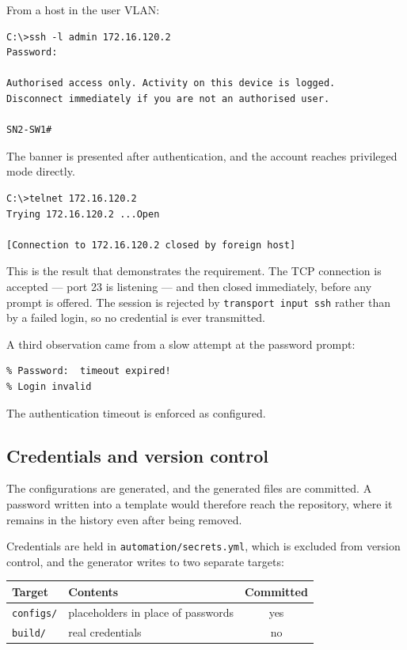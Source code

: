 \documentclass[12pt,a4paper]{article}
\begin{document}
From a host in the user VLAN:

\begin{lstlisting}
C:\>ssh -l admin 172.16.120.2
Password:

Authorised access only. Activity on this device is logged.
Disconnect immediately if you are not an authorised user.

SN2-SW1#
\end{lstlisting}

The banner is presented after authentication, and the account reaches
privileged mode directly.

\begin{lstlisting}
C:\>telnet 172.16.120.2
Trying 172.16.120.2 ...Open

[Connection to 172.16.120.2 closed by foreign host]
\end{lstlisting}

This is the result that demonstrates the requirement. The TCP connection is
accepted --- port 23 is listening --- and then closed immediately, before any
prompt is offered. The session is rejected by \texttt{transport input ssh}
rather than by a failed login, so no credential is ever transmitted.

A third observation came from a slow attempt at the password prompt:

\begin{lstlisting}
% Password:  timeout expired!
% Login invalid
\end{lstlisting}

The authentication timeout is enforced as configured.

\subsection{Credentials and version control}

The configurations are generated, and the generated files are committed. A
password written into a template would therefore reach the repository, where it
remains in the history even after being removed.

Credentials are held in \texttt{automation/secrets.yml}, which is excluded from
version control, and the generator writes to two separate targets:

\begin{table}[H]
\centering
\begin{tabular}{@{} l l c @{}}
\toprule
\textbf{Target} & \textbf{Contents} & \textbf{Committed} \\
\midrule
\texttt{configs/} & placeholders in place of passwords & yes \\
\texttt{build/}   & real credentials & no \\
\bottomrule
\end{tabular}
\end{table}
\end{document}
